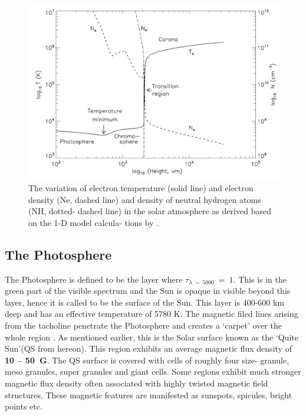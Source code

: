 \begin{figure}[h!]
    \centering
    \includegraphics[width = 0.8\linewidth]{Figures/solar_atm.png}
    \caption{The variation of electron temperature (solid line) and electron density (Ne, dashed line) and density of neutral hydrogen atoms (NH, dotted- dashed line) in the solar atmosphere as derived based on the 1-D model calcula- tions by .}
    \label{fig_solar_atm}
\end{figure}

\subsection{The Photosphere}\label{photosphere}

The Photosphere is defined to be the layer where $\tau_{\lambda~\sim~5000}~=~1$. This is in the green part of the visible spectrum and the Sun is opaque in visible beyond this layer, hence it is called to be the surface of the Sun. This layer is 400-600 km deep and has an effective temperature of 5780 K. The magnetic filed lines arising from the tacholine penetrate the Photosphere and creates a `carpet' over the whole region . As mentioned earlier, this is the Solar surface known as the `Quite Sun'(QS from hereon). This region exhibits an average magnetic flux density of \textbf{10 -- 50~G}. The QS surface is covered with cells of roughly four size- granule, meso granules, super granules and giant cells. Some regions exhibit much stronger magnetic flux density often associated with highly twisted magnetic field structures. These magnetic features are manifested as sunspots, spicules, bright points etc. 

